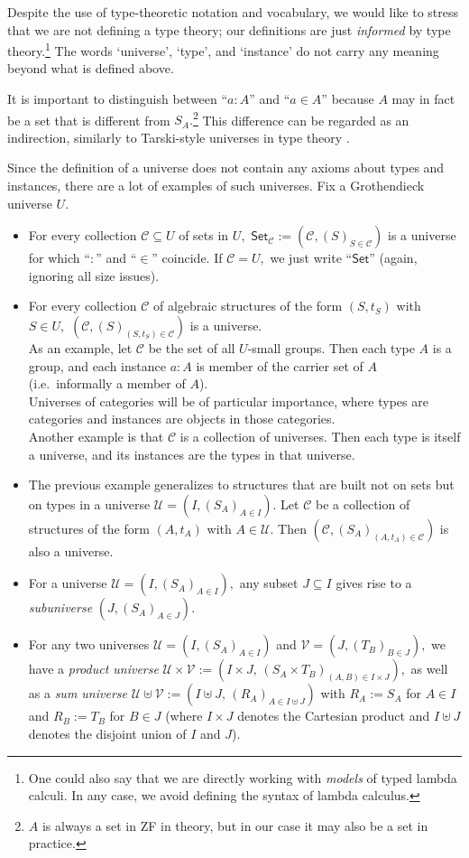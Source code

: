 \documentclass[a4paper]{article}
\theoremstyle{definition}
\theoremstyle{remark}
\newcommand{\defn}{\emph}
\newcommand{\C}{\mathcal{C}}
\newcommand{\U}{\mathcal{U}}
\newcommand{\V}{\mathcal{V}}
\newcommand{\nm}{\mathsf}
\newcommand{\universe}{\nm}
\newcommand{\Set}{\universe{Set}}
\begin{document}
Despite the use of type-theoretic notation and vocabulary, we would like to stress that we are not
defining a type theory; our definitions are just \emph{informed} by type theory.\footnote{One
could also say that we are directly working with \emph{models} of typed lambda calculi. In any case,
we avoid defining the syntax of lambda calculus.}
The words `universe', `type', and `instance' do not carry any meaning beyond what is defined above.

It is important to distinguish between ``$a : A$'' and ``$a \in A$'' because $A$ may in fact be a
set that is different from $S_A.$\footnote{$A$ is always a set in ZF in theory, but in our case it
may also be a set in practice.} This difference can be regarded as an indirection, similarly to
Tarski-style universes in type theory \cite{tarski}.

Since the definition of a universe does not contain any axioms about types and instances, there
are a lot of examples of such universes. Fix a Grothendieck universe $U.$

\begin{itemize}
  \item For every collection $\C \subseteq U$ of sets in $U,$ $\Set_\C := (\C, (S)_{S \in \C})$ is a
  universe for which ``$:$'' and ``$\in$'' coincide.
  If $\C = U,$ we just write ``$\Set$'' (again, ignoring all size issues).
  \item For every collection $\C$ of algebraic structures of the form $(S, t_S)$ with $S \in U,$
  $(\C, (S)_{(S, t_S) \in \C})$ is a universe.\\
  As an example, let $\C$ be the set of all $U$-small groups. Then each type $A$ is a group, and
  each instance $a : A$ is member of the carrier set of $A$ (i.e.\ informally a member of $A$).\\
  Universes of categories will be of particular importance, where types are categories and instances
  are objects in those categories.\\
  Another example is that $\C$ is a collection of universes. Then each type is itself a universe, and
  its instances are the types in that universe.
  \item The previous example generalizes to structures that are built not on sets but on types in a
  universe $\U = (I, (S_A)_{A \in I}).$ Let $\C$ be a collection of structures of the form $(A,t_A)$ with
  $A \in \U$. Then $(\C, (S_A)_{(A, t_A) \in \C})$ is also a universe.
  \item For a universe $\U = (I, (S_A)_{A \in I}),$ any subset $J \subseteq I$ gives rise to a
  \defn{subuniverse} $(J, (S_A)_{A \in J}).$
  \item For any two universes $\U = (I, (S_A)_{A \in I})$ and $\V = (J, (T_B)_{B \in J}),$ we have a
  \defn{product universe} $\U \times \V := (I{\times}J,\,(S_A{\times}T_B)_{(A,B) \in I{\times}J}),$ as
  well as a \defn{sum universe} $\U \uplus \V := (I \uplus J,\,(R_A)_{A \in I \uplus J})$ with
  $R_A := S_A$ for $A \in I$ and $R_B := T_B$ for $B \in J$ (where $I \times J$ denotes the Cartesian
  product and $I \uplus J$ denotes the disjoint union of $I$ and $J$).
\end{itemize}
\end{document}
